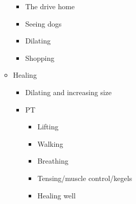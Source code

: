 \begin{itemize}
\begin{itemize}
    \begin{itemize}
    \tightlist
    \item
      The drive home
    \item
      Seeing dogs
    \item
      Dilating
    \item
      Shopping
    \end{itemize}
  \item
    Healing

    \begin{itemize}
    \tightlist
    \item
      Dilating and increasing size
    \item
      PT

      \begin{itemize}
      \tightlist
      \item
        Lifting
      \item
        Walking
      \item
        Breathing
      \item
        Tensing/muscle control/kegels
      \item
        Healing well
      \end{itemize}
    \end{itemize}
  \end{itemize}
\end{itemize}
